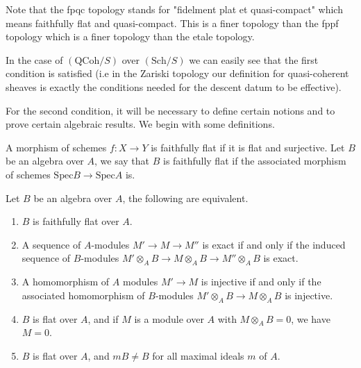 \noindent
Note that the fpqc topology stands for "fidelment plat et quasi-compact" which
means faithfully flat and quasi-compact.  This is a finer topology than the
fppf topology which is a finer topology than the etale topology.


\smallskip\noindent In the case of $(\text{QCoh}/S)$ over
$(\text{Sch}/S)$ we can easily see that the first condition is
satisfied (i.e in the Zariski topology our definition for
quasi-coherent sheaves is exactly the conditions needed for the
descent datum to be effective).

\smallskip\noindent For the second condition, it will be necessary to
define certain notions and to prove certain algebraic results.  We
begin with some definitions.

\begin{definition}
\label{definition-faithfully-flat}
A morphism of schemes $f: X \rightarrow Y$ is faithfully flat if it is flat
and surjective.  Let $B$ be an algebra over $A$, we say that $B$ is
faithfully flat if the associated morphism of schemes
$\text{Spec} B \rightarrow \text{Spec} A$ is. 
\end{definition}

\begin{proposition}
\label{proposition-faithfully-flat}
Let $B$ be an algebra over $A$, the following are equivalent.
\begin{enumerate}
\item $B$ is faithfully flat over $A$.
\item A sequence of $A$-modules $M' \rightarrow M \rightarrow M''$ is exact
if and only if the induced sequence of $B$-modules
$M' \otimes_A B \rightarrow M \otimes_A B \rightarrow M'' \otimes_A B$
is exact.
\item A homomorphism of $A$ modules $M' \rightarrow M$ is injective if and
only if the associated homomorphism of $B$-modules
$M' \otimes_A B \rightarrow M \otimes_A B$ is injective.
\item $B$ is flat over $A$, and if $M$ is a module over $A$ with
$M \otimes_A B = 0$, we have $M = 0$.
\item $B$ is flat over $A$, and $mB \neq B$ for all maximal ideals $m$
of $A$.	
\end{enumerate}
\end{proposition}

